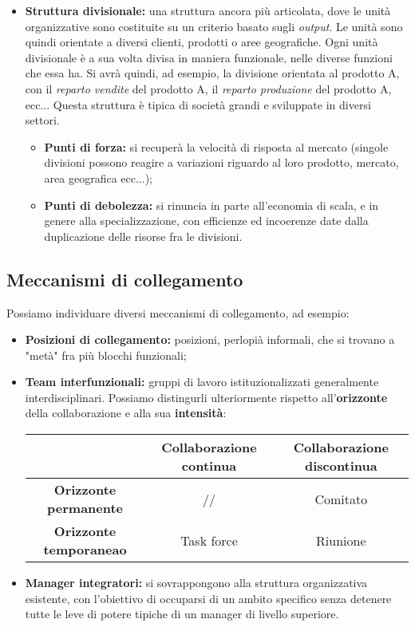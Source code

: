\documentclass[a4paper,11pt]{article}
\begin{document}
\begin{itemize}
	\item \textbf{Struttura divisionale:} una struttura ancora più articolata, dove le unità organizzative sono costituite su un criterio basato sugli \textit{output}.
		Le unità sono quindi orientate a diversi clienti, prodotti o aree geografiche.
		Ogni unità divisionale è a sua volta divisa in maniera funzionale, nelle diverse funzioni che essa ha.
		Si avrà quindi, ad esempio, la divisione orientata al prodotto A, con il \textit{reparto vendite} del prodotto A, il \textit{reparto produzione} del prodotto A, ecc...
		Questa struttura è tipica di società grandi e sviluppate in diversi settori.
		\begin{itemize}
			\item \textbf{Punti di forza:} si recuperà la velocità di risposta al mercato (singole divisioni possono reagire a variazioni riguardo al loro prodotto, mercato, area geografica ecc...);
			\item \textbf{Punti di debolezza:} si rinuncia in parte all'economia di scala, e in genere alla specializzazione, con efficienze ed incoerenze date dalla duplicazione delle risorse fra le divisioni.
		\end{itemize}
\end{itemize}

\subsection{Meccanismi di collegamento}
Possiamo individuare diversi meccanismi di collegamento, ad esempio:
\begin{itemize}
	\item \textbf{Posizioni di collegamento:} posizioni, perlopià informali, che si trovano a "metà" fra più blocchi funzionali; 
	\item \textbf{Team interfunzionali:} gruppi di lavoro istituzionalizzati generalmente interdisciplinari.
		Possiamo distingurli ulteriormente rispetto all'\textbf{orizzonte} della collaborazione e alla sua \textbf{intensità}:
		\begin{table}[h!]
			\center {}
			\begin{tabular} { c | c | c }
				& \bfseries Collaborazione continua & \bfseries Collaborazione discontinua \\ 
				\hline
				\bfseries Orizzonte permanente & // & Comitato \\ 
				\bfseries Orizzonte temporaneao & Task force & Riunione
			\end{tabular}
		\end{table}
	\item \textbf{Manager integratori:} si sovrappongono alla struttura organizzativa esistente, con l'obiettivo di occuparsi di un ambito specifico senza detenere tutte le leve di potere tipiche di un manager di livello superiore.
\end{itemize}
\end{document}
